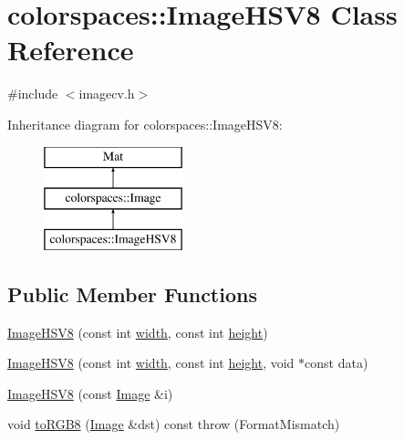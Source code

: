 \hypertarget{classcolorspaces_1_1_image_h_s_v8}{}\section{colorspaces\+:\+:Image\+H\+S\+V8 Class Reference}
\label{classcolorspaces_1_1_image_h_s_v8}


{\ttfamily \#include $<$imagecv.\+h$>$}

Inheritance diagram for colorspaces\+:\+:Image\+H\+S\+V8\+:\begin{figure}[H]
\begin{center}
\leavevmode
\includegraphics[height=3.000000cm]{classcolorspaces_1_1_image_h_s_v8}
\end{center}
\end{figure}
\subsection*{Public Member Functions}
\begin{DoxyCompactItemize}
\item 
\hyperlink{classcolorspaces_1_1_image_h_s_v8_ada49490260f27a0375ad4003d6b2e7c4}{Image\+H\+S\+V8} (const int \hyperlink{classcolorspaces_1_1_image_ab80af7d4797110c23ed575b329ec7c4f}{width}, const int \hyperlink{classcolorspaces_1_1_image_a99a05ebd37f61215b2c3042ecaefdbfc}{height})
\item 
\hyperlink{classcolorspaces_1_1_image_h_s_v8_abd2882a640de5b54949d95df94f2e98d}{Image\+H\+S\+V8} (const int \hyperlink{classcolorspaces_1_1_image_ab80af7d4797110c23ed575b329ec7c4f}{width}, const int \hyperlink{classcolorspaces_1_1_image_a99a05ebd37f61215b2c3042ecaefdbfc}{height}, void $\ast$const data)
\item 
\hyperlink{classcolorspaces_1_1_image_h_s_v8_a3cb82909c68c5b1f52b7ba34adbc3b3f}{Image\+H\+S\+V8} (const \hyperlink{classcolorspaces_1_1_image}{Image} \&i)
\item 
void \hyperlink{classcolorspaces_1_1_image_h_s_v8_ada6b9204de1a0f9a3c6c47744203fed1}{to\+R\+G\+B8} (\hyperlink{classcolorspaces_1_1_image}{Image} \&dst) const  throw (\+Format\+Mismatch)
\end{DoxyCompactItemize}

